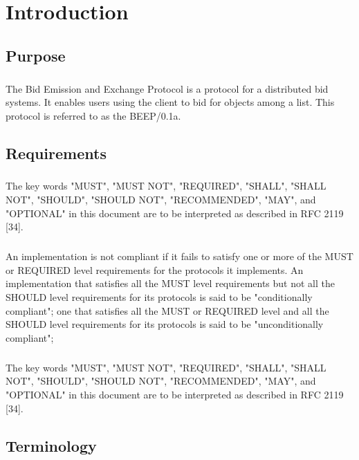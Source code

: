 
\chapter{Introduction}
    \section{Purpose}
        \paragraph{}
The Bid Emission and Exchange Protocol is a protocol for a distributed
bid systems. It enables users using the client to bid for objects among a list. This
protocol is referred to as the BEEP/0.1a.

    \section{Requirements}
        \paragraph{}
The key words "MUST", "MUST NOT", "REQUIRED", "SHALL", "SHALL NOT",
"SHOULD", "SHOULD NOT", "RECOMMENDED", "MAY", and "OPTIONAL" in this
document are to be interpreted as described in RFC 2119 [34].
        \paragraph{}
An implementation is not compliant if it fails to satisfy one or more
of the MUST or REQUIRED level requirements for the protocols it
implements. An implementation that satisfies all the MUST
level requirements but not all the SHOULD level requirements for its
protocols is said to be "conditionally compliant"; one that satisfies
all the MUST or REQUIRED level and all the SHOULD level requirements
for its protocols is said to be "unconditionally compliant";
        \paragraph{}
The key words "MUST", "MUST NOT", "REQUIRED", "SHALL", "SHALL NOT",
"SHOULD", "SHOULD NOT", "RECOMMENDED", "MAY", and "OPTIONAL" in this
document are to be interpreted as described in RFC 2119 [34].

    \section{Terminology}

